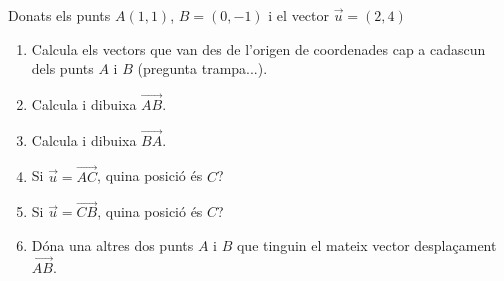 \Exercise Donats els punts $A(1,1)$, $B=(0,-1)$ i el vector $\vec{u}=(2,4)$
\begin{enumerate}
  \item Calcula els vectors que van des de l'origen de coordenades cap a cadascun dels punts $A$ i $B$ (pregunta trampa...).
  \item Calcula i dibuixa $\overrightarrow{AB}$.
  \item Calcula i dibuixa $\overrightarrow{BA}$.
  \item Si $\vec{u}=\overrightarrow{AC}$, quina posició és $C$?
  \item Si $\vec{u}=\overrightarrow{CB}$, quina posició és $C$?
  \item Dóna una altres dos punts $A$ i $B$ que tinguin el mateix vector desplaçament $\overrightarrow{AB}$.
\end{enumerate} 

